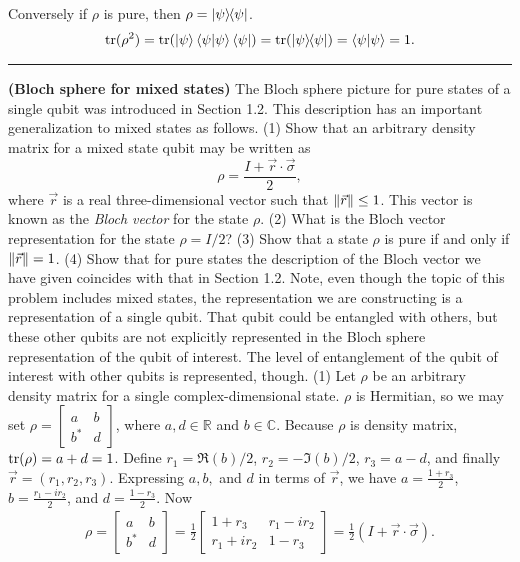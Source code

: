 Conversely if $\rho$ is pure, then $\rho = \ket{\psi}\hspace{-1mm} \bra{\psi}$.
\begin{align*}
    \operatorname{tr} (\rho^2) = \operatorname{tr} (\ket{\psi}\braket{\psi | \psi} \bra{\psi}) = \operatorname{tr} (\ket{\psi}\hspace{-1mm} \bra{\psi}) = \braket{\psi | \psi} = 1.
\end{align*}
\hrule

 \textbf{(Bloch sphere for mixed states)}  The Bloch sphere picture for pure states of a single qubit was introduced in Section 1.2.  This description has an important generalization to mixed states as follows.\newline
(1) Show that an arbitrary density matrix for a mixed state qubit may be written as $$\rho=\frac{I+\vec{r}\cdot\vec{\sigma}}{2},$$ where $\vec{r}$ is a real three-dimensional vector such that $\left\lVert\vec{r}\right\rVert\leq 1$.  This vector is known as the \textit{Bloch vector} for the state $\rho$. \newline
(2) What is the Bloch vector representation for the state $\rho = I/2$?\newline
(3) Show that a state $\rho$ is pure if and only if $\left\lVert\vec{r}\right\rVert= 1$.\newline
(4) Show that for pure states the description of the Bloch vector we have given coincides with that in Section 1.2.
\Soln Note, even though the topic of this problem includes mixed states, the representation we are constructing is a representation of a single qubit.  That qubit could be entangled with others, but these other qubits are not explicitly represented in the Bloch sphere representation of the qubit of interest.  The level of entanglement of the qubit of interest with other qubits is represented, though.\newline
(1) Let $\rho$ be an arbitrary density matrix for a single complex-dimensional state.  $\rho$ is Hermitian, so we may set $\rho = \begin{bmatrix}
    a & b \\ b^* & d
\end{bmatrix}$, where $a, d \in \mathds{R}$ and $b \in \mathds{C}$.
Because $\rho$ is density matrix, $\operatorname{tr} (\rho) = a+d = 1$.   Define $r_1 = \Re(b)/2$, $r_2=-\Im(b)/2$, $r_3 = a-d$, and finally $\vec{r}=(r_1,r_2,r_3)$.  Expressing $a,b,$ and $d$ in terms of $\vec{r}$, we have $a=\frac{1+r_3}{2}$, $b = \frac{r_1-ir_2}{2}$, and $d=\frac{1-r_3}{2}$.  Now
\begin{align*}
    \rho = \begin{bmatrix}
        a & b \\ b^* & d
    \end{bmatrix}
    =
    \frac{1}{2} \begin{bmatrix}
        1+r_3 & r_1 - ir_2 \\
        r_1 + ir_2 & 1 - r_3
    \end{bmatrix}
    =
    \frac{1}{2} (I + \vec{r} \cdot \vec{\sigma}).
\end{align*}
